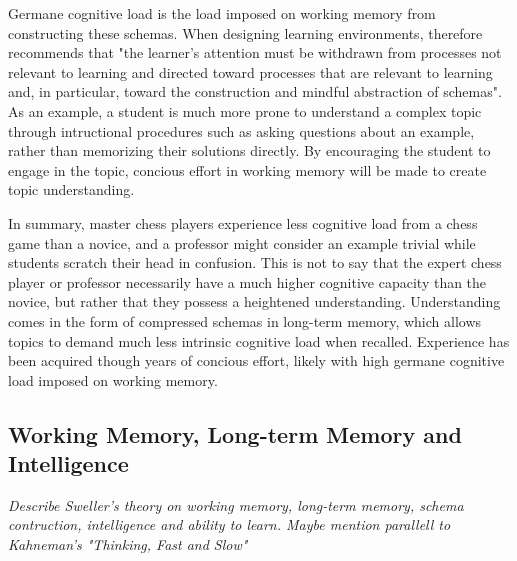 Germane cognitive load is the load imposed on working memory from constructing these schemas. When designing learning environments, \textcite{sweller1988} therefore recommends that "the learner's attention must be withdrawn from processes not relevant to learning and directed toward processes that are relevant to learning and, in particular, toward the construction and mindful abstraction of schemas". As an example, a student is much more prone to understand a complex topic through intructional procedures such as asking questions about an example, rather than memorizing their solutions directly. By encouraging the student to engage in the topic, concious effort in working memory will be made to create topic understanding. 

In summary, master chess players experience less cognitive load from a chess game than a novice, and a professor might consider an example trivial while students scratch their head in confusion. This is not to say that the expert chess player or professor necessarily have a much higher cognitive capacity than the novice, but rather that they possess a heightened understanding. Understanding comes in the form of compressed schemas in long-term memory, which allows topics to demand much less intrinsic cognitive load when recalled. Experience has been acquired though years of concious effort, likely with high germane cognitive load imposed on working memory.

\subsection{Working Memory, Long-term Memory and Intelligence}
\textit{Describe Sweller's theory on working memory, long-term memory, schema contruction, intelligence and ability to learn. Maybe mention parallell to Kahneman's "Thinking, Fast and Slow"}

\FloatBarrier